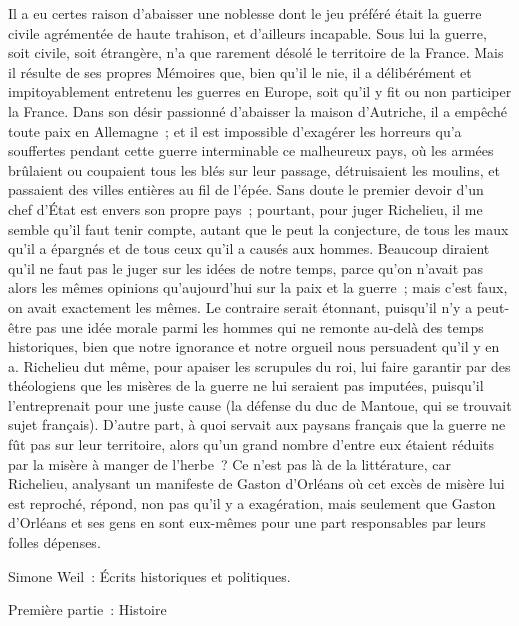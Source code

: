 \documentclass[french,twoside]{book} %
\begin{document}
Il a eu certes raison d'abaisser une noblesse dont le jeu préféré était la guerre civile agrémentée de haute trahison, et d'ailleurs incapable. Sous lui la guerre, soit civile, soit étrangère, n'a que rarement désolé le territoire de la France. Mais il résulte de ses propres Mémoires que, bien qu'il le nie, il a délibérément et impitoyablement entretenu les guerres en Europe, soit qu'il y fit ou non participer la France. Dans son désir passionné d'abaisser la maison d'Autriche, il a empêché toute paix en Allemagne ; et il est impossible d'exa­gérer les horreurs qu'a souffertes pendant cette guerre interminable ce malheureux pays, où les armées brûlaient ou coupaient tous les blés sur leur passage, détruisaient les moulins, et passaient des villes entières au fil de l'épée. Sans doute le premier devoir d'un chef d'État est envers son propre pays ; pourtant, pour juger Richelieu, il me semble qu'il faut tenir compte, autant que le peut la conjecture, de tous les maux qu'il a épargnés et de tous ceux qu'il a causés aux hommes. Beaucoup diraient qu'il ne faut pas le juger sur les idées de notre temps, parce qu'on n'avait pas alors les mêmes opinions qu'aujourd'hui sur la paix et la guerre ; mais c'est faux, on avait exactement les mêmes. Le contraire serait étonnant, puisqu'il n'y a peut-être pas une idée morale parmi les hommes qui ne remonte au-delà des temps historiques, bien que notre ignorance et notre orgueil nous persuadent qu'il y en a. Richelieu dut même, pour apaiser les scrupules du roi, lui faire garantir par des théolo­giens que les misères de la guerre ne lui seraient pas imputées, puisqu'il l'entreprenait pour une juste cause (la défense du duc de Mantoue, qui se trouvait sujet français). D'autre part, à quoi servait aux paysans français que la guerre ne fût pas sur leur territoire, alors qu'un grand nombre d'entre eux étaient réduits par la misère à manger de l'herbe ? Ce n'est pas là de la litté­rature, car Richelieu, analysant un manifeste de Gaston d'Orléans où cet excès de misère lui est reproché, répond, non pas qu'il y a exagération, mais seulement que Gaston d'Orléans et ses gens en sont eux-mêmes pour une part responsables par leurs folles dépenses.\par

\begin{center}
Simone Weil : Écrits historiques et politiques.\end{center}

\begin{center}
Première partie : Histoire\end{center}
\end{document}
